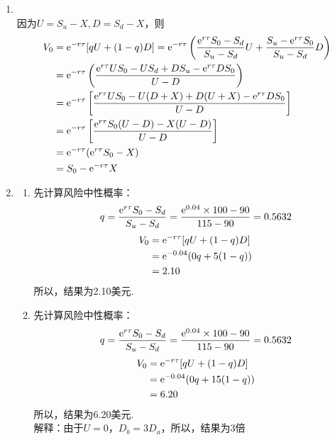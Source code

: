 \begin{enumerate}
    \item \pro\\
    因为$U = S_u - X,D = S_d-X$，则
    \begin{align*}
        V_0 & = \mathrm{e}^{-r\tau}[qU+(1-q)D] = \mathrm{e}^{-r\tau}\left(\frac{\mathrm{e}^{r\tau}S_0 - S_d}{S_u - S_d} U + \frac{S_u - \mathrm{e}^{r\tau}S_0}{S_u - S_d}D\right)\\
        & = \mathrm{e}^{-r\tau}\left(\frac{\mathrm{e}^{r\tau}US_0 - US_d + DS_u - \mathrm{e}^{r\tau}DS_0}{U-D}\right)\\
        & = \mathrm{e}^{-r\tau}\left[\frac{\mathrm{e}^{r\tau}US_0 - U(D+X) + D(U+X) - \mathrm{e}^{r\tau}DS_0}{U-D}\right]\\
        & = \mathrm{e}^{-r\tau}\left[\frac{\mathrm{e}^{r\tau}S_0(U-D) - X(U-D)}{U-D}\right]\\
        & = \mathrm{e}^{-r\tau}(\mathrm{e}^{r\tau}S_0 - X)\\
        & = S_0 - \mathrm{e}^{-r\tau}X
    \end{align*}
    \item \sol
    \begin{enumerate}[label=(\alph*)]
        \item 先计算风险中性概率：\[q = \frac{\mathrm{e}^{r\tau}S_0 - S_d}{S_u - S_d} = \frac{\mathrm{e}^{0.04} \times 100 - 90}{115-90} = 0.5632\]
        \begin{align*}
            V_0 & = \mathrm{e}^{-r\tau}[qU+(1-q)D]\\
            & = \mathrm{e}^{-0.04}(0q+5(1-q))\\
            & = 2.10
        \end{align*}
        所以，结果为2.10美元.
        \item 先计算风险中性概率：\[q = \frac{\mathrm{e}^{r\tau}S_0 - S_d}{S_u - S_d} = \frac{\mathrm{e}^{0.04} \times 100 - 90}{115-90} = 0.5632\]
        \begin{align*}
            V_0 & = \mathrm{e}^{-r\tau}[qU+(1-q)D]\\
            & = \mathrm{e}^{-0.04}(0q+15(1-q))\\
            & = 6.20
        \end{align*}
        所以，结果为6.20美元.\\
        解释：由于$U=0$，$D_b = 3D_a$，所以，结果为3倍
    \end{enumerate}
\end{enumerate}

